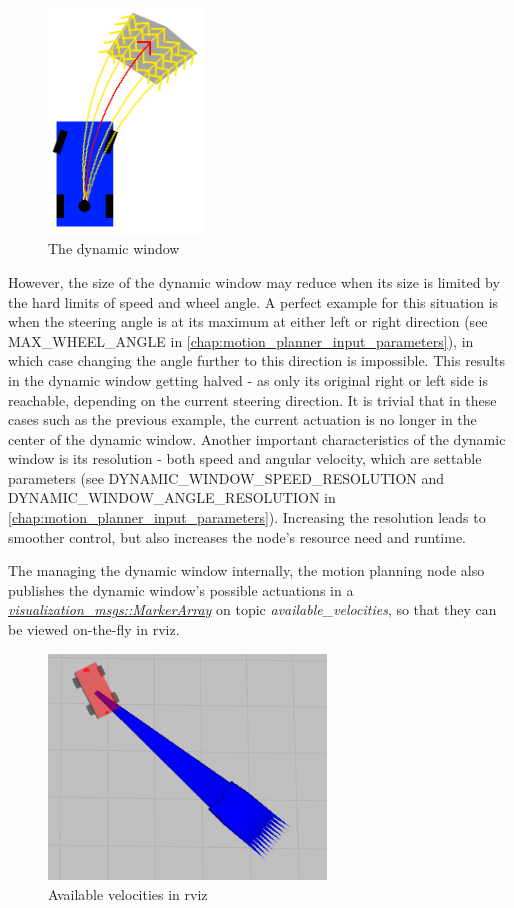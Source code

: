 \begin{figure}[!ht]
    \centering
    \includegraphics[height=60mm]{figures/raw/dynamic_window.png}
    \caption{The dynamic window}
    \label{dynamic_window}
\end{figure}

However, the size of the dynamic window may reduce when its size is limited by the hard limits of speed and wheel angle. A perfect example for this situation is when the steering angle is at its maximum at either left or right direction (see MAX\_WHEEL\_ANGLE in \ref{chap:motion_planner_input_parameters}), in which case changing the angle further to this direction is impossible. This results in the dynamic window getting halved - as only its original right or left side is reachable, depending on the current steering direction. It is trivial that in these cases such as the previous example, the current actuation is no longer in the center of the dynamic window.
Another important characteristics of the dynamic window is its resolution - both speed and angular velocity, which are settable parameters (see DYNAMIC\_WINDOW\_SPEED\_RESOLUTION and DYNAMIC\_WINDOW\_ANGLE\_RESOLUTION in \ref{chap:motion_planner_input_parameters}). Increasing the resolution leads to smoother control, but also increases the node's resource need and runtime.

The managing the dynamic window internally, the motion planning node also publishes the dynamic window's possible actuations in a \href{http://docs.ros.org/melodic/api/visualization_msgs/html/msg/MarkerArray.html}{\textit{visualization\_msgs::MarkerArray}} on topic \textit{available\_velocities}, so that they can be viewed on-the-fly in rviz.

\begin{figure}[!ht]
    \centering
    \includegraphics[height=60mm]{figures/raw/rviz_available_velocities.png}
    \caption{Available velocities in rviz}
    \label{rviz_available_velocities}
\end{figure}

